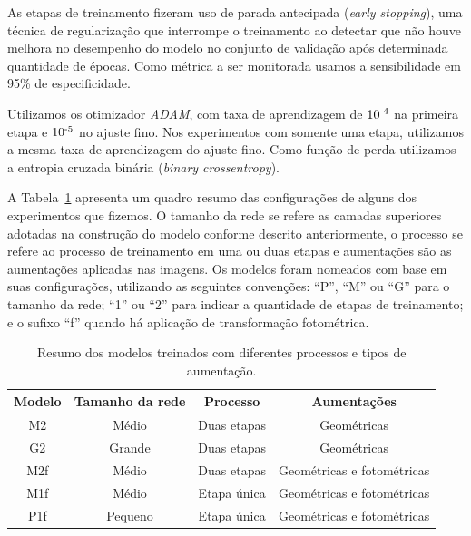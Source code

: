 \documentclass[12pt]{article}
\begin{document}
As etapas de treinamento fizeram uso de parada antecipada (\emph{early stopping}), uma técnica de regularização que interrompe o treinamento ao detectar que não houve melhora no desempenho do modelo no conjunto de validação após determinada quantidade de épocas. Como métrica a ser monitorada usamos a sensibilidade em 95\% de especificidade.

Utilizamos os otimizador \emph{ADAM}, com taxa de aprendizagem de $10\textsuperscript{-4}$ na primeira etapa e $10\textsuperscript{-5}$ no ajuste fino. Nos experimentos com somente uma etapa, utilizamos a mesma taxa de aprendizagem do ajuste fino. Como função de perda utilizamos a entropia cruzada binária (\emph{binary crossentropy}).

A Tabela~\ref{tab:modelos_class_binaria} apresenta um quadro resumo das configurações de alguns dos experimentos que fizemos. O tamanho da rede se refere as camadas superiores adotadas na construção do modelo conforme descrito anteriormente, o processo se refere ao processo de treinamento em uma ou duas etapas e aumentações são as aumentações aplicadas nas imagens. Os modelos foram nomeados com base em suas configurações, utilizando as seguintes convenções: ``P'', ``M'' ou ``G'' para o tamanho da rede; ``1'' ou ``2'' para indicar a quantidade de etapas de treinamento; e o sufixo ``f'' quando há aplicação de transformação fotométrica.


\begin{table}[h]
\centering
\begin{tabular}{cccc}
\toprule
\textbf{Modelo} & \textbf{Tamanho da rede} & \textbf{Processo} & \textbf{Aumentações} \\ 
\midrule
M2  & Médio   & Duas etapas  & Geométricas \\                %
G2  & Grande  & Duas etapas  & Geométricas \\                %
M2f & Médio   & Duas etapas  & Geométricas e fotométricas \\ %
M1f & Médio   & Etapa única  & Geométricas e fotométricas \\ %
P1f & Pequeno & Etapa única  & Geométricas e fotométricas \\ %
\bottomrule
\end{tabular}
\caption{Resumo dos modelos treinados com diferentes processos e tipos de aumentação.}
\label{tab:modelos_class_binaria}
\end{table}
\end{document}
